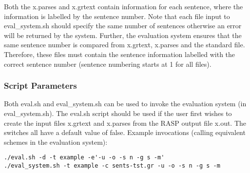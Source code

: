 \documentclass[10pt]{article}
\begin{document}
Both the x.parses and x.grtext contain information for each sentence,
where the information is labelled by the sentence number.
Note that each file input to eval\_system.sh should specify the
same number of sentences otherwise an error will be returned by the
system. Further, the evaluation system ensures that the same sentence
number is compared from x.grtext, x.parses and the standard file.
Therefore, these files must contain the sentence information labelled
with the correct sentence number (sentence numbering starts at 1 for
all files).

\subsubsection{Script Parameters}
\label{scriptparam}

Both eval.sh and eval\_system.sh can be used to invoke the
evaluation system (in eval\_system.sh). The eval.sh script
should be used if the user first wishes to create the input
files x.grtext and x.parses from the RASP output file x.out.
The switches all have a default value of false.
Example invocations (calling equivalent schemes 
in the evaluation system):
\begin{verbatim}
./eval.sh -d -t example -e'-u -o -s n -g s -m'
./eval_system.sh -t example -c sents-tst.gr -u -o -s n -g s -m
\end{verbatim}
\end{document}

